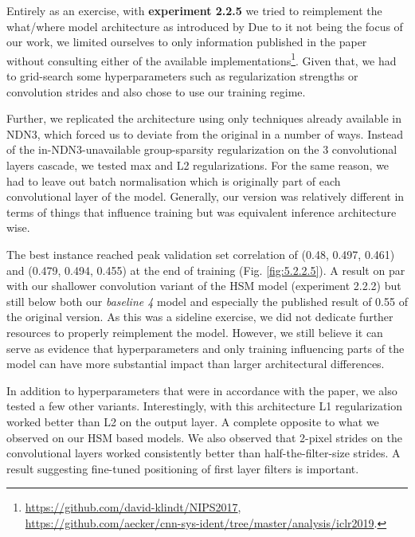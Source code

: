 Entirely as an exercise, with \textbf{experiment 2.2.5} we tried to reimplement the what/\-where model architecture as introduced by \cite{klindt} Due to it not being the focus of our work, we limited ourselves to only information published in the paper without consulting either of the available implementations\footnote{\href{https://github.com/david-klindt/NIPS2017}{https://github.com/david-klindt/NIPS2017}, \\ \href{https://github.com/aecker/cnn-sys-ident/tree/master/analysis/iclr2019}{https://github.com/aecker/cnn-sys-ident/tree/master/analysis/iclr2019}.}. Given that, we had to grid-search some hyperparameters such as regularization strengths or convolution strides and also chose to use our training regime. 

Further, we replicated the architecture using only techniques already available in NDN3, which forced us to deviate from the original in a number of ways. Instead of the in-NDN3-unavailable group-sparsity regularization on the 3 convolutional layers cascade, we tested max and L2 regularizations. For the same reason, we had to leave out batch normalisation which is originally part of each convolutional layer of the model. Generally, our version was relatively different in terms of things that influence training but was equivalent inference architecture wise.

The best instance reached peak validation set correlation of (0.48, 0.497, 0.461) and (0.479, 0.494, 0.455) at the end of training (Fig. \ref{fig:5.2.2.5}). A result on par with our shallower convolution variant of the HSM model (experiment 2.2.2) but still below both our \textit{baseline 4} model and especially the published result of 0.55 of the original \citeauthor{klindt} version. As this was a sideline exercise, we did not dedicate further resources to properly reimplement the model. However, we still believe it can serve as evidence that hyperparameters and only training influencing parts of the model can have more substantial impact than larger architectural differences.

In addition to hyperparameters that were in accordance with the paper, we also tested a few other variants. Interestingly, with this architecture L1 regularization worked better than L2 on the output layer. A complete opposite to what we observed on our HSM based models. We also observed that 2-pixel strides on the convolutional layers worked consistently better than half-the-filter-size strides. A result suggesting fine-tuned positioning of first layer filters is important.

